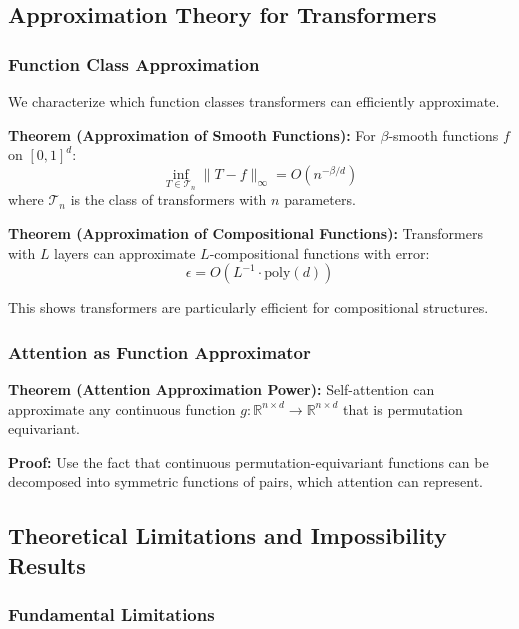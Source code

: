 \subsection{Approximation Theory for Transformers}

\subsubsection{Function Class Approximation}

We characterize which function classes transformers can efficiently approximate.

\textbf{Theorem (Approximation of Smooth Functions):} For $\beta$-smooth functions $f$ on $[0,1]^d$:
\begin{equation}
\inf_{T \in \mathcal{T}_n} \|T - f\|_\infty = O(n^{-\beta/d})
\end{equation}
where $\mathcal{T}_n$ is the class of transformers with $n$ parameters.

\textbf{Theorem (Approximation of Compositional Functions):} Transformers with $L$ layers can approximate $L$-compositional functions with error:
\begin{equation}
\epsilon = O(L^{-1} \cdot \text{poly}(d))
\end{equation}

This shows transformers are particularly efficient for compositional structures.

\subsubsection{Attention as Function Approximator}

\textbf{Theorem (Attention Approximation Power):} Self-attention can approximate any continuous function $g: \mathbb{R}^{n \times d} \rightarrow \mathbb{R}^{n \times d}$ that is permutation equivariant.

\textbf{Proof:} Use the fact that continuous permutation-equivariant functions can be decomposed into symmetric functions of pairs, which attention can represent.

\subsection{Theoretical Limitations and Impossibility Results}

\subsubsection{Fundamental Limitations}

